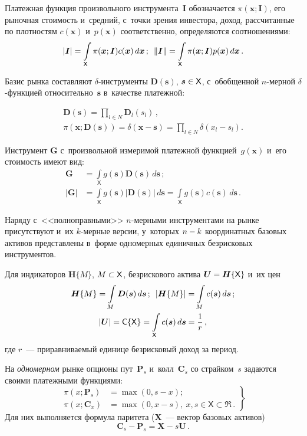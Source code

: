\begin{multicols}{2}
  Платежная функция произвольного инструмента~$\bm{I}$ обозначается 
$\pi(\bm{x}; \bm{I})$, его рыночная сто\-и\-мость и~средний, с~точки зрения 
инвестора, доход, рас\-счи\-тан\-ные по плотностям $c(\bm{x})$ и~$p(\bm{x})$ 
соответственно, определяются соотношениями: 
  $$
  \vert \bm{I}\vert =\int\limits_{\mathsf X} \pi (\bm{x};\bm{I}) 
c(\bm{x})\,d\bm{x}\,;\enskip
  \left\| \bm{I}\right\| =\int\limits_{\mathsf X} \pi(\bm{x};\bm{I}) 
p(\bm{x})\,d\bm{x}\,.
  $$
  
  Базис рынка составляют $\delta$-ин\-стру\-мен\-ты $\bm{D}(\bm{s})$, 
$\bm{s}\hm\in {\mathsf X}$, с~обобщенной $n$-мер\-ной $\delta$-функ\-ци\-ей 
относительно~$\bm{s}$ в~качестве платежной: 

\noindent
  \begin{multline}
    \bm{D}(\bm{s}) =\prod\limits_{l\in N} \bm{D}_l(s_l)\,,\\
  \pi(\bm{x};\bm{D}(\bm{s}))=\delta(\bm{x}-\bm{s})=\prod\limits_{l\in N} 
\delta(x_l-s_l).
  \label{1-aga}
  \end{multline}
  
  Инструмент $\bm{G}$ с~произвольной измеримой платежной 
функцией~$g(\bm{x})$ и~его стоимость имеют вид: 
  \begin{align*}
  \bm{G}&= \int\limits_{\mathsf X} g(\bm{s}) \bm{D}(\bm{s})\,d\bm{s}\,;\\
  \vert \bm{G}\vert &=\int\limits_{\mathsf X} g(\bm{s}) \vert \bm{D}(\bm{s}) \vert 
\,d\bm{s}= \int\limits_{\mathsf X} g(\bm{s}) c(\bm{s}) \,d\bm{s}\,.
  \end{align*}
  
  Наряду с~<<полноправными>> $n$-мер\-ны\-ми инструментами на рынке 
присутствуют и~их $k$-мер\-ные версии, у~которых $n\hm- k$ координатных 
базовых активов пред\-став\-ле\-ны в~форме одномерных единичных без\-рис\-ко\-вых 
инструментов. 
  
  Для индикаторов $\bm{H}\{M\}$, $M\hm\subset {\mathsf X}$, без\-рис\-ко\-во\-го 
актива $\bm{U}\hm=\bm{H}\{ {\mathsf X}\}$ и~их цен 
  \begin{gather*}
  \bm{H}\{ M\}=\int\limits_M \bm{D}(\bm{s})\, d\bm{s}\,;\enskip
   \vert \bm{H}\{M\}\vert =\int\limits_M c(\bm{s})\,d\bm{s}\,;\\
   \vert \bm{U}\vert ={\mathsf C}\{ {\mathsf X}\}= \int\limits_{\mathsf X} c(\bm{s}) 
\,d\bm{s}=\displaystyle\frac{\displaystyle 1\mathstrut}{\displaystyle r\mathstrut}\,,
   \end{gather*}
где $r$~--- приравниваемый единице безрисковый доход за период. 
  
  На \textit{одномерном} рынке опционы пут~$\bm{P}_s$ и~колл~$\bm{C}_s$ 
со страйком~$s$ задаются своими платежными функциями: 
  \begin{equation}
  \left.
  \begin{array}{rl}
  \pi(x;\bm{P}_s)&=\max (0,s-x);\\[6pt]
  \pi(x;{\bm C}_x)&=\max (0,x-s),\ x,s \in {\mathsf X}\subset \mathfrak{R}\,.
  \end{array}
  \right\}
  \label{e2-aga}
  \end{equation}
  Для них выполняется формула паритета ($\bm{X}$~--- вектор базовых 
активов)
  $$
  \bm{C}_s-\bm{P}_s= \bm{X}-s\bm{U}\,.
  $$
  

\end{multicols}
